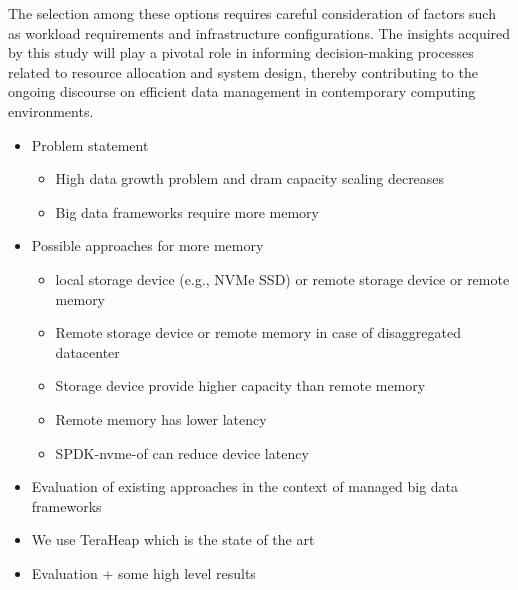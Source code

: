 The selection among these options requires careful consideration of factors such as workload requirements and infrastructure configurations. The insights acquired by this study will play a pivotal role in informing decision-making processes related to resource allocation and system design, thereby contributing to the ongoing discourse on efficient data management in contemporary computing environments.
\begin{itemize}
  \item Problem statement
  \begin{itemize}
    \item High data growth problem and dram capacity scaling decreases
    \item Big data frameworks require more memory
  \end{itemize}

  \item Possible approaches for more memory
  \begin{itemize}
    \item local storage device (e.g., NVMe SSD) or remote storage device or
      remote memory 
    \item Remote storage device or remote memory in case of disaggregated
      datacenter
    \item Storage device provide higher capacity than remote memory
    \item Remote memory has lower latency
    \item SPDK-nvme-of can reduce device latency
  \end{itemize}

  \item Evaluation of existing approaches in the context of managed big data
    frameworks 
  \item We use TeraHeap which is the state of the art

  \item {Evaluation + some high level results}
\end{itemize}
